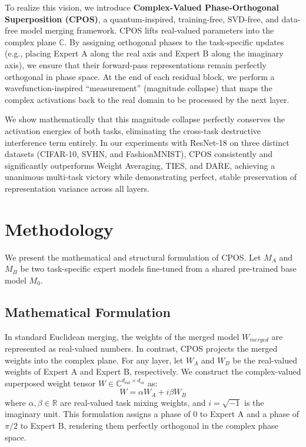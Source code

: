 \documentclass{article}
\theoremstyle{plain}
\theoremstyle{definition}
\theoremstyle{remark}
\begin{document}
To realize this vision, we introduce \textbf{Complex-Valued Phase-Orthogonal Superposition (CPOS)}, a quantum-inspired, training-free, SVD-free, and data-free model merging framework. CPOS lifts real-valued parameters into the complex plane $\mathbb{C}$. By assigning orthogonal phases to the task-specific updates (e.g., placing Expert A along the real axis and Expert B along the imaginary axis), we ensure that their forward-pass representations remain perfectly orthogonal in phase space. At the end of each residual block, we perform a wavefunction-inspired ``measurement'' (magnitude collapse) that maps the complex activations back to the real domain to be processed by the next layer.

We show mathematically that this magnitude collapse perfectly conserves the activation energies of both tasks, eliminating the cross-task destructive interference term entirely. In our experiments with ResNet-18 on three distinct datasets (CIFAR-10, SVHN, and FashionMNIST), CPOS consistently and significantly outperforms Weight Averaging, TIES, and DARE, achieving a unanimous multi-task victory while demonstrating perfect, stable preservation of representation variance across all layers.

\section{Methodology}
\label{sec:method}

We present the mathematical and structural formulation of CPOS. Let $M_A$ and $M_B$ be two task-specific expert models fine-tuned from a shared pre-trained base model $M_0$. 

\subsection{Mathematical Formulation}
In standard Euclidean merging, the weights of the merged model $W_{merged}$ are represented as real-valued numbers. In contrast, CPOS projects the merged weights into the complex plane. For any layer, let $W_A$ and $W_B$ be the real-valued weights of Expert A and Expert B, respectively. We construct the complex-valued superposed weight tensor $W \in \mathbb{C}^{d_{out} \times d_{in}}$ as:
\begin{equation}
W = \alpha W_A + i \beta W_B
\end{equation}
where $\alpha, \beta \in \mathbb{R}$ are real-valued task mixing weights, and $i = \sqrt{-1}$ is the imaginary unit. This formulation assigns a phase of $0$ to Expert A and a phase of $\pi/2$ to Expert B, rendering them perfectly orthogonal in the complex phase space.
\end{document}
